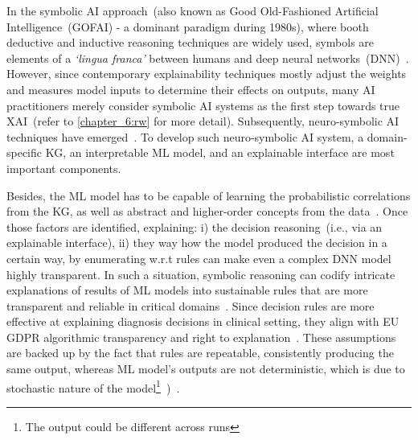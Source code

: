 \hspace*{3.5mm} In the symbolic AI approach~(also known as Good Old-Fashioned Artificial Intelligence~(GOFAI) - a dominant paradigm during 1980s), where booth deductive and inductive reasoning techniques are widely used, symbols are elements of a \textit{`lingua franca'} between humans and deep neural networks~(DNN)~\cite{janssens2007dynamic}. However, since contemporary explainability techniques mostly adjust the weights and measures model inputs to determine their effects on outputs, many AI practitioners merely consider symbolic AI systems as the first step towards true XAI~(refer to \cref{chapter_6:rw} for more detail). 
Subsequently, neuro-symbolic AI techniques have emerged~\cite{futia2020integration}.  %
To develop such neuro-symbolic AI system, a domain-specific KG, an interpretable ML model, and an explainable interface are most important components. 

\hspace*{3.5mm} Besides, the ML model has to be capable of learning the probabilistic correlations from the KG, as well as abstract and higher-order concepts from the data~\cite{SAI}. Once those factors are identified, explaining: i) the decision reasoning~(i.e., via an explainable interface), ii) they way how the model produced the decision in a certain way, by enumerating w.r.t rules can make even a complex DNN model highly transparent. In such a situation, symbolic reasoning can codify intricate explanations of results of ML models into sustainable rules that are more transparent and reliable in critical domains~\cite{futia2020integration}. Since decision rules are more effective at explaining diagnosis decisions in clinical setting, they align with EU GDPR algorithmic transparency and right to explanation~\cite{kaminski2019right}.
These assumptions are backed up by the fact that rules are repeatable, consistently producing the same output, whereas ML model's outputs are not deterministic, which is due to stochastic nature of the model\footnote{The output could be different across runs}~\cite{karim2019onconetexplainer})~\cite{alshahrani2017neuro}.

